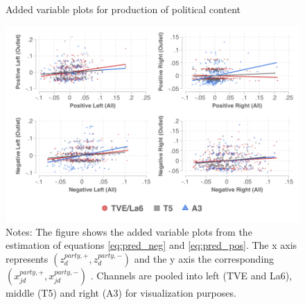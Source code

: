 \documentclass[12pt]{article}
\begin{document}
	

	
	
		\begin{figure}[h!]
		\centering
\caption{Added variable plots for production of political content}
		\includegraphics[width=160mm]{figures/fwl_plots}
		\caption*{\small Notes: The figure shows the added variable plots from the estimation of equations   \ref{eq:pred_neg} and \ref{eq:pred_pos}. The x axis represents $(z_d^{party,+},z_d^{party,-}) $ and the y axis the corresponding  $(x_{jd}^{party,+},x_{jd}^{party,-}) $   . Channels are pooled into left (TVE and La6), middle (T5) and right (A3) for visualization purposes.  }
		\label{fig:fwl}
	\end{figure}
	
\end{document}
